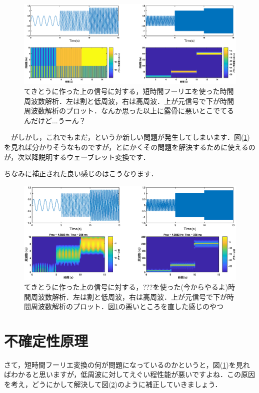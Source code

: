 \documentclass[11pt,a4paper]{ujreport} 	%
\begin{document}
\begin{figure}[H]
  \label{im:tft}
  \centering
  \includegraphics[width=15cm]{../figures/tft.eps}
  \caption{てきとうに作った上の信号に対する，短時間フーリエを使った時間周波数解析．左は割と低周波，右は高周波．上が元信号で下が時間周波数解析のプロット．なんか思った以上に露骨に悪いとこでてるんだけど...うーん？}
\end{figure}

　がしかし，これでもまだ，というか新しい問題が発生してしまいます．図(\ref{im:tft})を見れば分かりそうなものですが，とにかくその問題を解決するために使えるのが，次以降説明するウェーブレット変換です．

ちなみに補正された良い感じのはこうなります．

\begin{figure}[H]
  \label{im:tft2}
  \centering
  \includegraphics[width=15cm]{../figures/tft2.eps}
  \caption{てきとうに作った上の信号に対する，???を使った(今からやるよ)時間周波数解析．左は割と低周波，右は高周波．上が元信号で下が時間周波数解析のプロット．図\ref{im:tft}の悪いところを直した感じのやつ}
\end{figure}

\section{不確定性原理}
さて，短時間フーリエ変換の何が問題になっているのかというと，図(\ref{im:tft})を見ればわかると思いますが，低周波に対してえぐい程性能が悪いですよね．この原因を考え，どうにかして解決して図(\ref{im:tft2})のように補正していきましょう．
\end{document}
